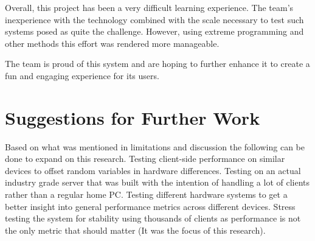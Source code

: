 \documentclass[12pt,a4paper,twoside]{report}
\begin{document}
Overall, this project has been a very difficult learning experience. The team's inexperience with the technology combined with the scale necessary to test such systems posed as quite the challenge. However, using extreme programming and other methods this effort was rendered more manageable.

The team is proud of this system and are hoping to further enhance it to create a fun and engaging experience for its users.





\newpage
\section{Suggestions for Further Work}
Based on what was mentioned in limitations and discussion the following can be done to expand on this research. Testing client-side performance on similar devices to offset random variables in hardware differences. Testing on an actual industry grade server that was built with the intention of handling a lot of clients rather than a regular home PC. Testing different hardware systems to get a better insight into general performance metrics across different devices. Stress testing the system for stability using thousands of clients as performance is not the only metric that should matter (It was the focus of this research).
\end{document}
